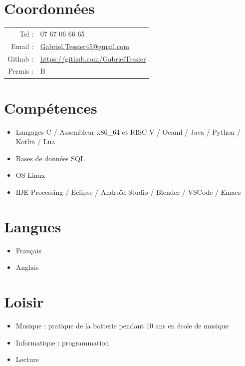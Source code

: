 \documentclass[11pt,oneside,a4paper,titlepage]{article}
\begin{document}
\begin{tcolorbox}
  \begin{minipage}[t]{8cm}
    \vspace*{-0.5cm}
    \begin{tcolorbox}[grow to left by=0.6cm,colback=gray!25,colframe=white]
      \section*{Coordonnées}
      \setlength{\tabcolsep}{2pt}
      \begin{tabular}{rl}
        Tel : & 07 67 06 66 65 \\
        Email : & \href{mailto:Gabriel.Tessier45@gmail.com}{Gabriel.Tessier45@gmail.com} \\
        Github : & \href{https://github.com/GabrielTessier}{https://github.com/GabrielTessier} \\
        Permis : & B
      \end{tabular}

      \section*{Compétences}
      \begin{itemize}
        \item{Langages C / Assembleur x86\_64 et RISC-V / Ocaml / Java / Python / Kotlin / Lua}
        \item{Bases de données SQL}
        \item{OS Linux}
        \item{IDE Processing / Eclipse / Androïd Studio / Blender / VSCode / Emacs}
      \end{itemize}

      \section*{Langues}
      \begin{itemize}
        \item{Français}
        \item{Anglais}
      \end{itemize}

      \section*{Loisir}
      \begin{itemize}
        \item{Musique : pratique de la batterie pendant 10 ans en école de musique}
        \item{Informatique : programmation}
        \item{Lecture}
      \end{itemize}
    \end{tcolorbox}
  \end{minipage}
  \begin{minipage}[t]{11cm}
    \vspace*{-0.5cm}
    \begin{tcolorbox}[grow to right by=0.75cm,colframe=white,colback=white]

\end{tcolorbox}
\end{minipage}
\end{tcolorbox}
\end{document}
